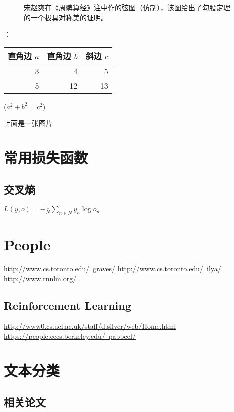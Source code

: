 \begin{figure}[ht]
\centering
\caption{宋赵爽在《周髀算经》注中作的弦图（仿制），该图给出了勾股定理的一个极具对称美的证明。} 
\label{fig:cnn}
\end{figure}：

\begin{table}[H]
\begin{tabular}{|rrr|}
\hline
直角边 $a$ & 直角边 $b$ & 斜边 $c$\\
\hline
3 & 4 & 5 \\
5 & 12 & 13 \\
\hline
\end{tabular}%
\qquad
($a^2 + b^2 = c^2$)
\end{table}

上面是一张图片

\section{常用损失函数}

\subsection{交叉熵}

$L(y,o)=-\frac{1}{N}\sum\limits_{n \in N}{y_{n}\log{o_{n}}}$

\section{People}
\href{Alex Graves}{http://www.cs.toronto.edu/~graves/}
\href{Ilya Sutskever}{http://www.cs.toronto.edu/~ilya/}
\href{Tomas Mikolov}{http://www.rnnlm.org/}

\subsection{Reinforcement Learning}
\href{David Silver}{http://www0.cs.ucl.ac.uk/staff/d.silver/web/Home.html}
\href{Pieter Abbeel}{https://people.eecs.berkeley.edu/~pabbeel/}


\section{文本分类}
\subsection{相关论文}


